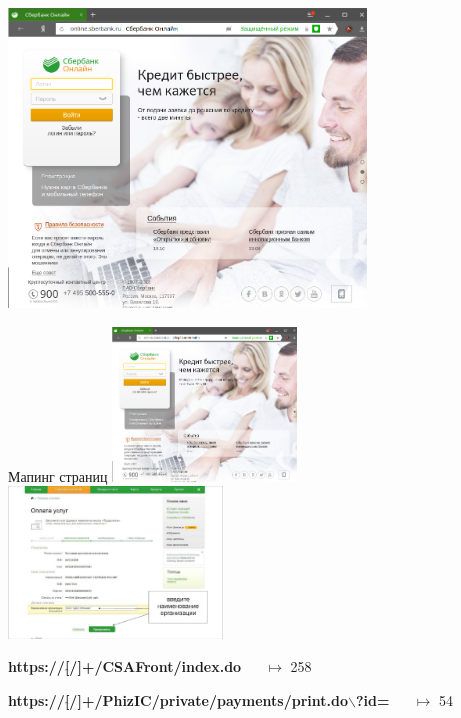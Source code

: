 \begin{frame}
		
	\begin{center}
		\includegraphics[width=9.5cm]{../pic/sber_logo_1.png}\centering
	\end{center}

\end{frame}

\begin{frame}{Мапинг страниц}
	\includegraphics[width=4.9cm]{../pic/sber_logo_1.png}
	\includegraphics[width=5.7cm]{../pic/sber_logo_2.png}
	
	\textbf{https://[$\hat{}$/]+/CSAFront/index.do} ~~ $\longmapsto$ 258
	
	\textbf{https://[$\hat{}$/]+/PhizIC/private/payments/print.do$\backslash$?id=} ~~ $\longmapsto$ 54
\end{frame}

